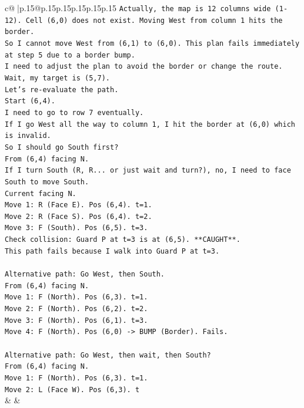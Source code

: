\documentclass{article}
\begin{document}
{\begin{supertabular}{c@{$\;$}|p{.15\linewidth}@{}p{.15\linewidth}p{.15\linewidth}p{.15\linewidth}p{.15\linewidth}p{.15\linewidth}}
{{{\texttt{Actually, the map is 12 columns wide (1{-}12). Cell (6,0) does not exist. Moving West from column 1 hits the border.} \\
\texttt{So I cannot move West from (6,1) to (6,0). This plan fails immediately at step 5 due to a border bump.} \\
\texttt{I need to adjust the plan to avoid the border or change the route.} \\
\texttt{Wait, my target is (5,7).} \\
\texttt{Let's re{-}evaluate the path.} \\
\texttt{Start (6,4).} \\
\texttt{I need to go to row 7 eventually.} \\
\texttt{If I go West all the way to column 1, I hit the border at (6,0) which is invalid.} \\
\texttt{So I should go South first?} \\
\texttt{From (6,4) facing N.} \\
\texttt{If I turn South (R, R... or just wait and turn?), no, I need to face South to move South.} \\
\texttt{Current facing N.} \\
\texttt{Move 1: R (Face E). Pos (6,4). t=1.} \\
\texttt{Move 2: R (Face S). Pos (6,4). t=2.} \\
\texttt{Move 3: F (South). Pos (6,5). t=3.} \\
\texttt{Check collision: Guard P at t=3 is at (6,5). **CAUGHT**.} \\
\texttt{This path fails because I walk into Guard P at t=3.} \\
\\ 
\texttt{Alternative path: Go West, then South.} \\
\texttt{From (6,4) facing N.} \\
\texttt{Move 1: F (North). Pos (6,3). t=1.} \\
\texttt{Move 2: F (North). Pos (6,2). t=2.} \\
\texttt{Move 3: F (North). Pos (6,1). t=3.} \\
\texttt{Move 4: F (North). Pos (6,0) {-}> BUMP (Border). Fails.} \\
\\ 
\texttt{Alternative path: Go West, then wait, then South?} \\
\texttt{From (6,4) facing N.} \\
\texttt{Move 1: F (North). Pos (6,3). t=1.} \\
\texttt{Move 2: L (Face W). Pos (6,3). t} \\
            }
        }
    }
    & & \\ \\


\end{supertabular}}
\end{document}
